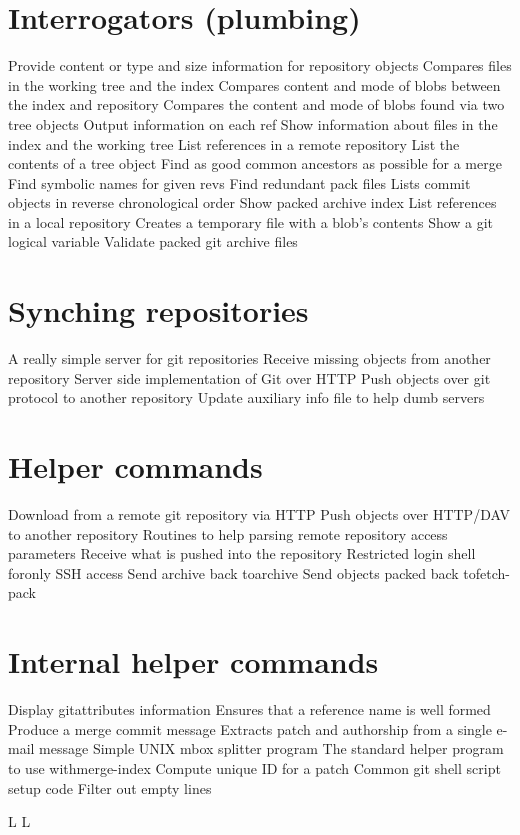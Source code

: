 \section{Interrogators (plumbing)}
	{Provide content or type and size information for repository objects}
	{Compares files in the working tree and the index}
	{Compares content and mode of blobs between the index and repository}
	{\emergencystretch=5pt Compares the content and mode of blobs found via two tree objects}
	{Output information on each ref}
	{Show information about files in the index and the working tree}
	{List references in a remote repository}
	{List the contents of a tree object}
	{Find as good common ancestors as possible for a merge}
	{Find symbolic names for given revs}
	{Find redundant pack files}
	{Lists commit objects in reverse chronological order}
	{Show packed archive index}
	{List references in a local repository}
	{Creates a temporary file with a blob’s contents}
	{Show a git logical variable}
	{Validate packed git archive files}

\section{Synching repositories}
	{A really simple server for git repositories}
	{Receive missing objects from another repository}
	{Server side implementation of Git over HTTP}
	{Push objects over git protocol to another repository}
	{Update auxiliary info file to help dumb servers}

\section{Helper commands}
	{Download from a remote git repository via HTTP}
	{Push objects over HTTP/DAV to another repository}
	{Routines to help parsing remote repository access parameters}
	{Receive what is pushed into the repository}
	{Restricted login shell foronly SSH access}
	{Send archive back toarchive}
	{Send objects packed back tofetch-pack}

\section{Internal helper commands}
	{Display gitattributes information}
	{Ensures that a reference name is well formed}
	{Produce a merge commit message}
	{Extracts patch and authorship from a single e-mail message}
	{Simple UNIX mbox splitter program}
	{The standard helper program to use withmerge-index}
	{Compute unique ID for a patch}
	{Common git shell script setup code}
	{Filter out empty lines}

\copyrightnotice

\supereject
\if L\lr \else\null\vfill\eject\fi
\if L\lr \else\null\vfill\eject\fi
\bye

